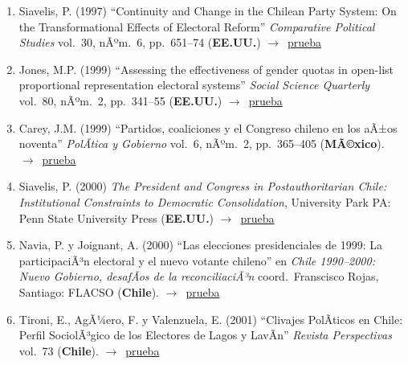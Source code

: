 \documentclass[12 pt, letter]{article}
\newenvironment{CitasMiTrabajo}{
    \begin{footnotesize}
    \begin{enumerate}[label={\footnotesize\emph{cita~\arabic*}},ref=\arabic*] %
        \setlength{\itemsep}{.1\itemsep}
        \setlength{\parskip}{.1\parskip}
    }{\end{enumerate}\end{footnotesize}}
\begin{document}
        \begin{CitasMiTrabajo}

        \item Siavelis, P. (1997)
        ``Continuity and Change in the Chilean Party System: On the Transformational Effects of Electoral
        Reform''
        \emph{Comparative Political Studies} vol.\ 30, nÃºm.\ 6, pp.\ 651--74
        (\textbf{EE.UU.}) $\rightarrow$~\href{http://ericmagar.com/cv/cites/mrs/siavelis97.pdf}{prueba}

        \item Jones, M.P. (1999) ``Assessing the effectiveness of
        gender quotas in open-list proportional representation electoral
        systems'' \emph{Social Science Quarterly} vol.\ 80, nÃºm.\ 2, pp.\ 341--55
        (\textbf{EE.UU.}) $\rightarrow$~\href{http://ericmagar.com/cv/cites/mrs/jonesSSQ99.pdf}{prueba}

        \item Carey, J.M. (1999)
        ``Partidos, coaliciones y el Congreso chileno en los aÃ±os noventa''
        \emph{PolÃ­tica y Gobierno}
        vol.\ 6, nÃºm.\ 2, pp.\ 365--405   (\textbf{MÃ©xico}). $\rightarrow$~\href{http://ericmagar.com/cv/cites/mrs/careyPartCongChile1999pyg.excerpt.pdf}{prueba}

        \item Siavelis, P. (2000) \emph{The President and Congress in
        Postauthoritarian Chile: Institutional Constraints to Democratic
        Consolidation}, University Park PA: Penn State University Press
        (\textbf{EE.UU.}) $\rightarrow$~\href{http://ericmagar.com/cv/cites/mrs/siavelisPdtCongPostAutChi.pdf}{prueba}

        \item Navia, P. y Joignant, A. (2000)
        ``Las elecciones presidenciales de 1999:
        La participaciÃ³n electoral y el nuevo votante chileno'' en \emph{Chile 1990--2000:
        Nuevo Gobierno, desafÃ­os de la reconciliaciÃ³n} coord.\ Franscisco Rojas,
        Santiago: FLACSO (\textbf{Chile}). $\rightarrow$~\href{http://ericmagar.com/cv/cites/mrs/naviaJoignantFlacso.pdf}{prueba}

        \item Tironi, E., AgÃ¼ero, F. y Valenzuela, E. (2001)
        ``Clivajes PolÃ­ticos en Chile: Perfil SociolÃ³gico de los Electores de Lagos y LavÃ­n''
        \emph{Revista Perspectivas} vol.\ 73 (\textbf{Chile}). $\rightarrow$~\href{http://ericmagar.com/cv/cites/mrs/tironietal2001.pdf}{prueba}


\end{CitasMiTrabajo}
\end{document}

